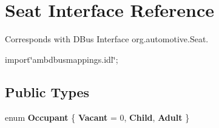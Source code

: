\hypertarget{interfaceSeat}{\section{Seat Interface Reference}
\label{interfaceSeat}
}


Corresponds with D\+Bus Interface org.\+automotive.\+Seat.  




{\ttfamily import\char`\"{}ambdbusmappings.\+idl\char`\"{};}

\subsection*{Public Types}
\begin{DoxyCompactItemize}
\item 
\hypertarget{interfaceSeat_a3c9ef0f8dfe920cbae9ec47c3674a270}{enum {\bfseries Occupant} \{ {\bfseries Vacant} = 0, 
{\bfseries Child}, 
{\bfseries Adult}
 \}}\label{interfaceSeat_a3c9ef0f8dfe920cbae9ec47c3674a270}

\end{DoxyCompactItemize}
